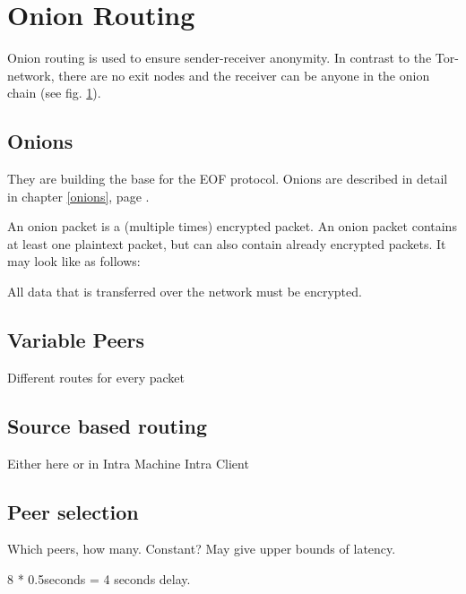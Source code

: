 \section{Onion Routing}
\label{onionrouting}
Onion routing is used to ensure sender-receiver anonymity. In contrast
to the Tor-network, there are no exit nodes and the receiver can be anyone
in the onion chain (see fig. \ref{onionrouting}).

\subsection{Onions}
\label{eofonion}

They are building the base for the EOF protocol.
Onions are described in detail in chapter \ref{onions}, page \pageref{onions}.

An onion packet is a (multiple times) encrypted packet.
An onion packet contains at least one plaintext packet, but can also contain
already encrypted packets. It may look like as follows:

All data that is transferred over the network must be encrypted.

\subsection{Variable Peers}
Different routes for every packet

\subsection{Source based routing}
Either here or in Intra Machine Intra Client
\subsection{Peer selection}
Which peers, how many. Constant? May give upper bounds of latency.

8 * 0.5seconds = 4 seconds delay.


